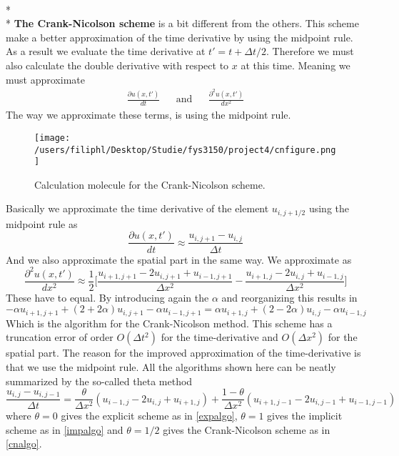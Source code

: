 \documentclass[norsk, a4paper]{article}
\newcommand\lr[1]{\left(#1\right)}
\begin{document}
\\*\\*
\textbf{The Crank-Nicolson scheme} 
is a bit different from the others. This scheme make a better approximation of the time derivative by using the midpoint rule. As a result we evaluate the time derivative at $t'=t+\Delta t/2$. Therefore we must also calculate the double derivative with respect to $x$ at this time. Meaning we must approximate
\begin{align*}
&&&&&&\frac{\partial u(x,t')}{dt}& &\text{and}& &\frac{\partial^2 u(x,t')}{dx^2}&&&&&&
\end{align*}
The way we approximate these terms, is using the midpoint rule.
\begin{figure}[H]
\begin{center}
  \texttt{[image: /users/filiphl/Desktop/Studie/fys3150/project4/cnfigure.png]}
  \caption{Calculation molecule for the Crank-Nicolson scheme.}\label{fig:cnfig}
  \end{center}
\end{figure}
\noindent
Basically we approximate the time derivative of the element $u_{i,j+1/2}$ using the midpoint rule as 
\[
\frac{\partial u(x,t')}{dt} \approx \frac{u_{i,j+1}-u_{i,j}}{\Delta t}
\]
And we also approximate the spatial part in the same way. We approximate
as \[
\frac{\partial^2 u(x,t')}{dx^2} \approx \frac{1}{2}\bigg[ \frac{u_{i+1,j+1}-2u_{i,j+1} + u_{i-1,j+1}}{\Delta x^2} - \frac{u_{i+1,j}-2u_{i,j} + u_{i-1,j}}{\Delta x^2}  \bigg]
\]
These have to equal. By introducing again the $\alpha$ and reorganizing this results in
\begin{equation}
-\alpha u_{i+1,j+1} + (2+2\alpha)u_{i,j+1} - \alpha u_{i-1,j+1} = \alpha u_{i+1,j} + (2-2\alpha)u_{i,j} - \alpha u_{i-1,j} \label{cnalgo}
\end{equation}
Which is the algorithm for the Crank-Nicolson method. This scheme has a truncation error of order $O(\Delta t^2)$ for the time-derivative and $O(\Delta x^2)$ for the spatial part. The reason for the improved approximation of the time-derivative is that we use the midpoint rule.
All the algorithms shown here can be neatly summarized by the so-called theta method
\begin{equation*}
\frac{u_{i,j}-u_{i,j-1}}{\Delta t} = \frac{\theta}{\Delta x^2}\lr{u_{i-1,j} - 2u_{i,j} + u_{i+1,j}}+\frac{1-\theta}{\Delta x^2}\lr{u_{i+1,j-1} - 2u_{i,j-1} + u_{i-1,j-1}}
\end{equation*}
where $\theta = 0$ gives the explicit scheme as in \eqref{expalgo}, $\theta = 1$ gives the implicit scheme as in \eqref{impalgo} and $\theta = 1/2$ gives the Crank-Nicolson scheme as in \eqref{cnalgo}.
\end{document}
